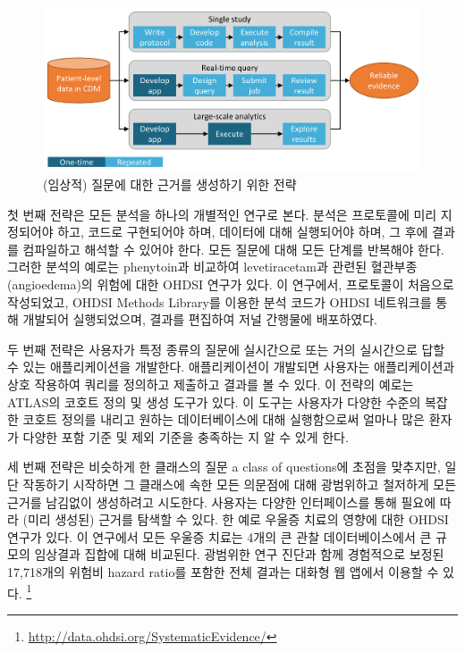 \documentclass[11pt]{book}
\let\rmarkdownfootnote\footnote%
\def\footnote{\protect\rmarkdownfootnote}
\theoremstyle{definition}
\theoremstyle{definition}
\theoremstyle{definition}
\theoremstyle{remark}
\begin{document}
\begin{figure}

{\centering \includegraphics[width=0.9\linewidth]{images/OhdsiAnalyticsTools/strategies} 

}

\caption{(임상적) 질문에 대한 근거를 생성하기 위한 전략}\label{fig:strategies}
\end{figure}

첫 번째 전략은 모든 분석을 하나의 개별적인 연구로 본다. 분석은
프로토콜에 미리 지정되어야 하고, 코드로 구현되어야 하며, 데이터에 대해
실행되어야 하며, 그 후에 결과를 컴파일하고 해석할 수 있어야 한다. 모든
질문에 대해 모든 단계를 반복해야 한다. 그러한 분석의 예로는 phenytoin과
비교하여 levetiracetam과 관련된 혈관부종(angioedema)의 위험에 대한 OHDSI
연구가 있다. \citep{duke_2017} 이 연구에서, 프로토콜이 처음으로
작성되었고, OHDSI Methods Library를 이용한 분석 코드가 OHDSI 네트워크를
통해 개발되어 실행되었으며, 결과를 편집하여 저널 간행물에 배포하였다.

두 번째 전략은 사용자가 특정 종류의 질문에 실시간으로 또는 거의
실시간으로 답할 수 있는 애플리케이션을 개발한다. 애플리케이션이 개발되면
사용자는 애플리케이션과 상호 작용하여 쿼리를 정의하고 제출하고 결과를 볼
수 있다. 이 전략의 예로는 ATLAS의 코호트 정의 및 생성 도구가 있다. 이
도구는 사용자가 다양한 수준의 복잡한 코호트 정의를 내리고 원하는
데이터베이스에 대해 실행함으로써 얼마나 많은 환자가 다양한 포함 기준 및
제외 기준을 충족하는 지 알 수 있게 한다.

세 번째 전략은 비슷하게 한 클래스의 질문 a class of questions에 초점을
맞추지만, 일단 작동하기 시작하면 그 클래스에 속한 모든 의문점에 대해
광범위하고 철저하게 모든 근거를 남김없이 생성하려고 시도한다. 사용자는
다양한 인터페이스를 통해 필요에 따라 (미리 생성된) 근거를 탐색할 수
있다. 한 예로 우울증 치료의 영향에 대한 OHDSI 연구가 있다.
\citep{schuemie_2018b} 이 연구에서 모든 우울증 치료는 4개의 큰 관찰
데이터베이스에서 큰 규모의 임상결과 집합에 대해 비교된다. 광범위한 연구
진단과 함께 경험적으로 보정된 17,718개의 위험비 hazard ratio를 포함한
전체 결과는 대화형 웹 앱에서 이용할 수 있다. \footnote{\url{http://data.ohdsi.org/SystematicEvidence/}}
\end{document}
